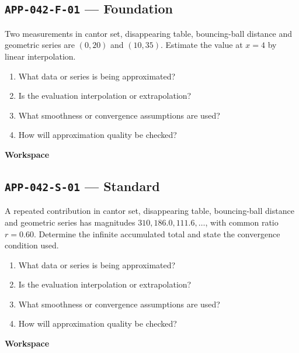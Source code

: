 \documentclass[11pt]{book}
\newcommand{\pid}[1]{\texttt{#1}}
\newcommand{\workspace}{\par\vspace{0.7in}\hrulefill\par\vspace{0.55in}\hrulefill\par}
\begin{document}
\subsection*{\pid{APP-042-F-01} — Foundation}
\begin{problembox}
Two measurements in cantor set, disappearing table, bouncing-ball distance and geometric series are $(0,20)$ and $(10,35)$. Estimate the value at $x=4$ by linear interpolation.
\end{problembox}
\begin{promptbox}\begin{enumerate}
\item What data or series is being approximated?
\item Is the evaluation interpolation or extrapolation?
\item What smoothness or convergence assumptions are used?
\item How will approximation quality be checked?
\end{enumerate}\end{promptbox}
\textbf{Workspace}\workspace
{}
\subsection*{\pid{APP-042-S-01} — Standard}
\begin{problembox}
A repeated contribution in cantor set, disappearing table, bouncing-ball distance and geometric series has magnitudes $310, 186.0, 111.6,\ldots$, with common ratio $r=0.60$. Determine the infinite accumulated total and state the convergence condition used.
\end{problembox}
\begin{promptbox}\begin{enumerate}
\item What data or series is being approximated?
\item Is the evaluation interpolation or extrapolation?
\item What smoothness or convergence assumptions are used?
\item How will approximation quality be checked?
\end{enumerate}\end{promptbox}
\textbf{Workspace}\workspace
{}
\end{document}
